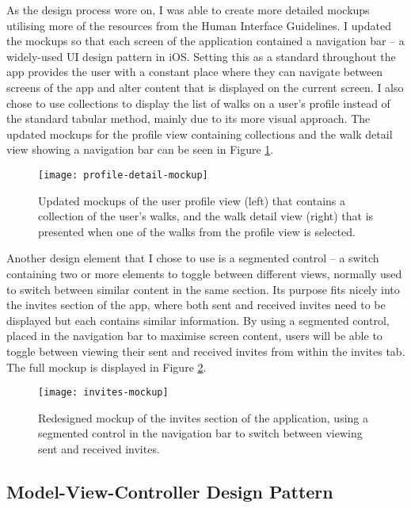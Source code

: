 As the design process wore on, I was able to create more detailed mockups utilising more of the resources from the Human Interface Guidelines. I updated the mockups so that each screen of the application contained a navigation bar -- a widely-used UI design pattern in iOS. Setting this as a standard throughout the app provides the user with a constant place where they can navigate between screens of the app and alter content that is displayed on the current screen. I also chose to use collections to display the list of walks on a user's profile instead of the standard tabular method, mainly due to its more visual approach. The updated mockups for the profile view containing collections and the walk detail view showing a navigation bar can be seen in Figure \ref{fig:profile-detail-mockup}.

\begin{figure}[hbt]
  \centering
  \texttt{[image: profile-detail-mockup]}
  \caption{Updated mockups of the user profile view (left) that contains a collection of the user's walks, and the walk detail view (right) that is presented when one of the walks from the profile view is selected.}
  \label{fig:profile-detail-mockup}
\end{figure}

Another design element that I chose to use is a segmented control -- a switch containing two or more elements to toggle between different views, normally used to switch between similar content in the same section. Its purpose fits nicely into the invites section of the app, where both sent and received invites need to be displayed but each contains similar information. By using a segmented control, placed in the navigation bar to maximise screen content, users will be able to toggle between viewing their sent and received invites from within the invites tab. The full mockup is displayed in Figure \ref{fig:invites-mockup}.

\begin{figure}[hbt]
  \centering
  \texttt{[image: invites-mockup]}
  \caption{Redesigned mockup of the invites section of the application, using a segmented control in the navigation bar to switch between viewing sent and received invites.}
  \label{fig:invites-mockup}
\end{figure}


\subsection{Model-View-Controller Design Pattern}

